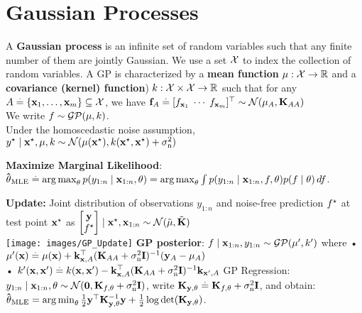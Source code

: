 \section{Gaussian Processes}
\begin{framed}
    A \textbf{Gaussian process} is an infinite set of random variables such that any finite number of them are jointly Gaussian. We use a set $\mathcal{X}$ to index the collection of random variables.
    A GP is characterized by a \textbf{mean function} $\mu : \mathcal{X} \to \mathbb{R}$ and a \textbf{covariance (kernel) function}) $k : \mathcal{X} \times \mathcal{X} \to \mathbb{R}$ such that for any $A \overset{.}{=} \{\mathbf{x}_1, \dots, \mathbf{x}_m\} \subseteq \mathcal{X}$, we have 
  $\vf_\sA \defeq \transpose{[f_{\vx_1} \; \cdots \; f_{\vx_m}]} \sim \N{\vmu_\sA}{\mK_{\sA\sA}}$ \\
We write $f \sim \GP{\mu}{k}$. \\
Under the homoscedastic noise assumption, \\
  $\ys \mid \vxs, \mu, k \sim \N{\mu(\vxs)}{k(\vxs, \vxs) + \sigman^2}$ \\
  \vspace{0.15mm}
\end{framed}
\begin{framed}
    \textbf{Maximize Marginal Likelihood}: \\
    $ \mathbf{\hat{\theta}}_{\mathrm{MLE}} \overset{.}{=} \operatorname*{arg\,max}_{\mathbf{\theta}} p(y_{1:n} \mid \mathbf{x}_{1:n}, \mathbf{\theta}) \\= \operatorname*{arg\,max}_{\mathbf{\theta}} \int p(y_{1:n} \mid \mathbf{x}_{1:n}, f, \mathbf{\theta}) p(f \mid \mathbf{\theta}) \,d f$.
\end{framed}
\textbf{Update:} Joint distribution of observations $y_{1:n}$ and noise-free prediction $f^\star$ at test point $\mathbf{x^\star}$ as $\begin{bmatrix}
    \vy \\
    \fs \\
  \end{bmatrix} \mid \vxs, \vx_{1:n} \sim \N{\Tilde{\vmu}}{\Tilde{\mK}}$ \\
\texttt{[image: images/GP\_Update]}
\textbf{GP posterior}: 
$f \mid \vx_{1:n}, y_{1:n} \sim \GP{\mu'}{k'}$ where 
• $ \mu'(\mathbf{x}) \overset{.}{=} \mu(\mathbf{x}) + \mathbf{k}_{\mathbf{x},A}^\top (\mathbf{K}_{AA} + \sigma_{\mathrm{n}}^2 \mathbf{I})^{-1} (\mathbf{y}_A - \mathbf{\mu}_A)$ \\
• $ k'(\mathbf{x}, \mathbf{x'}) \overset{.}{=} k(\mathbf{x}, \mathbf{x'}) - \mathbf{k}_{\mathbf{x},A}^\top (\mathbf{K}_{AA} + \sigma_{\mathrm{n}}^2 \mathbf{I})^{-1} \mathbf{k}_{\mathbf{x'},A}$
GP Regression: $y_{1:n} \mid \vx_{1:n}, \vtheta \sim \N{\vzero}{\mK_{f,\vtheta} + \sigman^2 \mI}$, write $\mathbf{K}_{\mathbf{y},\mathbf{\theta}} \overset{.}{=} \mathbf{K}_{f,\mathbf{\theta}} + \sigma_{\mathrm{n}}^2 \mathbf{I}$, and obtain: $\vthetahat_\MLE = \argmin_{\vtheta} \frac{1}{2} \transpose{\vy} \inv{\mK_{\vy,\vtheta}} \vy + \frac{1}{2} \log \det{\mK_{\vy,\vtheta}}$.
